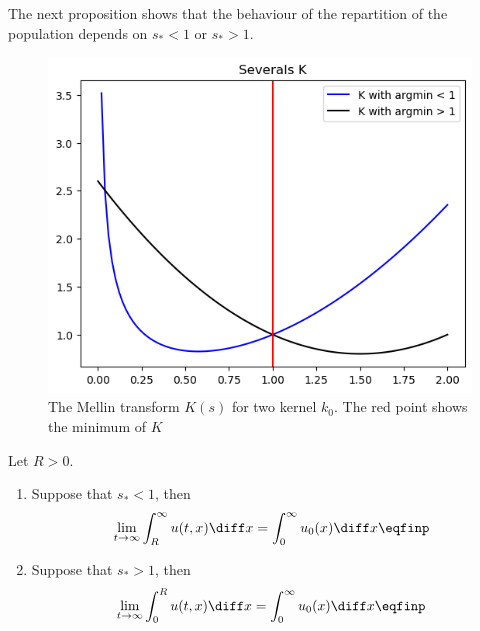 The next proposition shows that the behaviour of the repartition of the population depends on $s_* < 1$ or $s_* > 1$. 
\begin{figure}
    \centering
    \includegraphics[scale=0.8]{pictures/severalK.png}
    \caption{The Mellin transform $K(s)$ for two kernel $k_0$. The red point shows the minimum of $K$ }
    \label{fig:severalK}
\end{figure}

\begin{proposition} Let $R>0$.
    \begin{enumerate}
        \item Suppose that $s_* < 1$, then
            \begin{align*}
            \lim_{t\to \infty} \int_R^\infty u(t,x) \diff x = \int_0^\infty u_0(x) \diff x
            \eqfinp
            \end{align*}
        \item Suppose that $s_* > 1$, then
            \begin{align*}
            \lim_{t\to \infty} \int_0^R u(t,x) \diff x = \int_0^\infty u_0(x) \diff x
            \eqfinp
            \end{align*}
    \end{enumerate}
\end{proposition}

